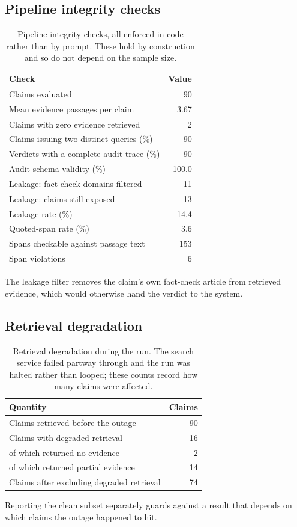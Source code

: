 \documentclass[11pt,a4paper]{article}
\begin{document}
\subsection{Pipeline integrity checks}
\begin{table}[H]
\centering
\small
\caption{Pipeline integrity checks, all enforced in code rather than by prompt. These hold by construction and so do not depend on the sample size.}
\label{tab:integrity}
\begin{tabular}{@{}lr@{}}
\toprule
\textbf{Check} & \textbf{Value} \\
\midrule
Claims evaluated & 90 \\
Mean evidence passages per claim & 3.67 \\
Claims with zero evidence retrieved & 2 \\
Claims issuing two distinct queries (\%) & 90 \\
Verdicts with a complete audit trace (\%) & 90 \\
Audit-schema validity (\%) & 100.0 \\
Leakage: fact-check domains filtered & 11 \\
Leakage: claims still exposed & 13 \\
Leakage rate (\%) & 14.4 \\
Quoted-span rate (\%) & 3.6 \\
Spans checkable against passage text & 153 \\
Span violations & 6 \\
\bottomrule
\end{tabular}
\par\vspace{2pt}\footnotesize{The leakage filter removes the claim's own fact-check article from retrieved evidence, which would otherwise hand the verdict to the system.}
\end{table}
\subsection{Retrieval degradation}
\begin{table}[H]
\centering
\small
\caption{Retrieval degradation during the run. The search service failed partway through and the run was halted rather than looped; these counts record how many claims were affected.}
\label{tab:degraded}
\begin{tabular}{@{}lr@{}}
\toprule
\textbf{Quantity} & \textbf{Claims} \\
\midrule
Claims retrieved before the outage & 90 \\
Claims with degraded retrieval & 16 \\
  of which returned no evidence & 2 \\
  of which returned partial evidence & 14 \\
Claims after excluding degraded retrieval & 74 \\
\bottomrule
\end{tabular}
\par\vspace{2pt}\footnotesize{Reporting the clean subset separately guards against a result that depends on which claims the outage happened to hit.}
\end{table}
\clearpage
\end{document}
